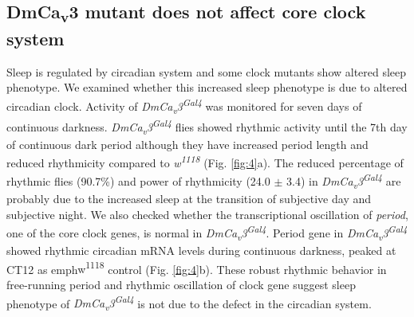 \subsection*{DmCa\textsubscript{v}3 mutant does not affect core clock system}

Sleep is regulated by circadian system and some clock mutants show altered sleep phenotype\cite{12568241, 19038223}.
We examined whether this increased sleep phenotype is due to altered circadian clock.
Activity of \emph{DmCa\textsubscript{v}3\textsuperscript{Gal4}} was monitored for seven days of continuous darkness.
\emph{DmCa\textsubscript{v}3\textsuperscript{Gal4}} flies showed rhythmic activity until the 7th day of continuous dark period although they have increased period length and reduced rhythmicity compared to \emph{w\textsuperscript{1118}} (Fig. \ref{fig:4}a). The reduced percentage of rhythmic flies (90.7\%) and power of rhythmicity (24.0 $\pm$ 3.4) in \emph{DmCa\textsubscript{v}3\textsuperscript{Gal4}} are probably due to the increased sleep at the transition of subjective day and subjective night.
We also checked whether the transcriptional oscillation of \emph{period}, one of the core clock genes, is normal in \emph{DmCa\textsubscript{v}3\textsuperscript{Gal4}}. 
Period gene in \emph{DmCa\textsubscript{v}3\textsuperscript{Gal4}} showed rhythmic circadian mRNA levels during continuous darkness, peaked at CT12 as emph{w\textsuperscript{1118}} control (Fig. \ref{fig:4}b).
These robust rhythmic behavior in free-running period and rhythmic oscillation of clock gene suggest sleep phenotype of \emph{DmCa\textsubscript{v}3\textsuperscript{Gal4}} is not due to the defect in the circadian system. 
    
  
  
  
  
  
  
  